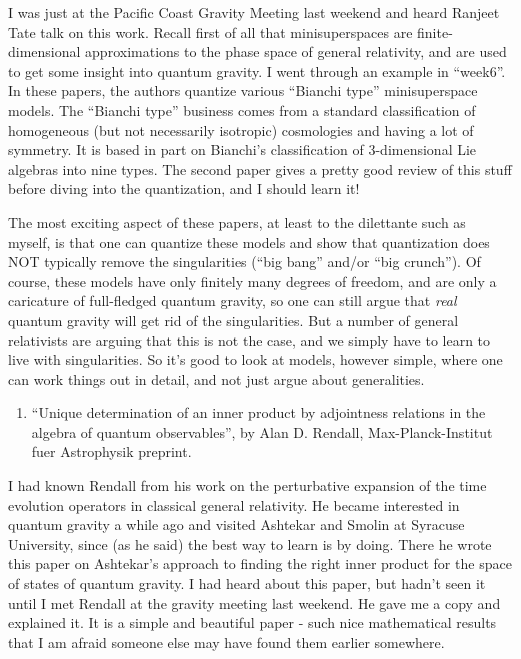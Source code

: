 \documentclass{article}
\def\tightlist{}
\begin{document}
I was just at the Pacific Coast Gravity Meeting last weekend and heard
Ranjeet Tate talk on this work. Recall first of all that minisuperspaces
are finite-dimensional approximations to the phase space of general
relativity, and are used to get some insight into quantum gravity. I
went through an example in ``week6''. In these papers, the authors
quantize various ``Bianchi type'' minisuperspace models. The ``Bianchi
type'' business comes from a standard classification of homogeneous (but
not necessarily isotropic) cosmologies and having a lot of symmetry. It
is based in part on Bianchi's classification of 3-dimensional Lie
algebras into nine types. The second paper gives a pretty good review of
this stuff before diving into the quantization, and I should learn it!

The most exciting aspect of these papers, at least to the dilettante
such as myself, is that one can quantize these models and show that
quantization does NOT typically remove the singularities (``big bang''
and/or ``big crunch''). Of course, these models have only finitely many
degrees of freedom, and are only a caricature of full-fledged quantum
gravity, so one can still argue that \emph{real} quantum gravity will
get rid of the singularities. But a number of general relativists are
arguing that this is not the case, and we simply have to learn to live
with singularities. So it's good to look at models, however simple,
where one can work things out in detail, and not just argue about
generalities.

\begin{enumerate}
\def\labelenumi{\arabic{enumi})}
\setcounter{enumi}{2}
\tightlist
\item
  ``Unique determination of an inner product by adjointness relations in
  the algebra of quantum observables'', by Alan D. Rendall,
  Max-Planck-Institut fuer Astrophysik preprint.
\end{enumerate}

I had known Rendall from his work on the perturbative expansion of the
time evolution operators in classical general relativity. He became
interested in quantum gravity a while ago and visited Ashtekar and
Smolin at Syracuse University, since (as he said) the best way to learn
is by doing. There he wrote this paper on Ashtekar's approach to finding
the right inner product for the space of states of quantum gravity. I
had heard about this paper, but hadn't seen it until I met Rendall at
the gravity meeting last weekend. He gave me a copy and explained it. It
is a simple and beautiful paper - such nice mathematical results that I
am afraid someone else may have found them earlier somewhere.
\end{document}
